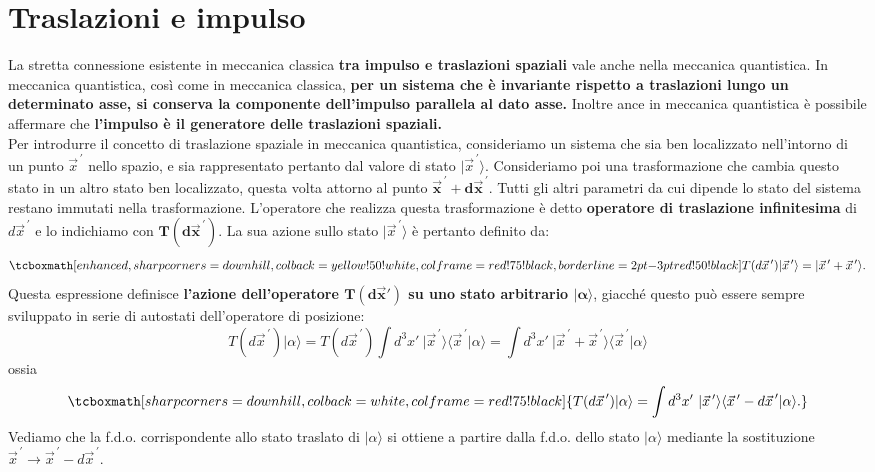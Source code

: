 \chapter[Traslazioni e impulso]{Traslazioni e impulso}
La stretta connessione esistente in meccanica classica \textbf{tra impulso e traslazioni spaziali} vale anche nella meccanica quantistica. In meccanica quantistica, così come in meccanica classica, \textbf{per un sistema che è invariante rispetto a traslazioni lungo un determinato asse, si conserva la componente dell'impulso parallela al dato asse.} Inoltre ance in meccanica quantistica è possibile affermare che \textbf{l'impulso è il generatore delle traslazioni spaziali.}\\

Per introdurre il concetto di traslazione spaziale in meccanica quantistica, consideriamo un sistema che sia ben localizzato nell'intorno di un punto ${\vec{x}}^{\, \prime}$ nello spazio, e sia rappresentato pertanto dal valore di stato $\vert {\vec{x}}^{\, \prime} \rangle$. Consideriamo poi una trasformazione che cambia questo stato in un altro stato ben localizzato, questa volta attorno al punto $\mathbf{{\vec{x}}^{\, \prime} + d{\vec{x}}^{\, \prime}}$. Tutti gli altri parametri da cui dipende lo stato del sistema restano immutati nella trasformazione. L'operatore che realizza questa trasformazione è detto \textbf{operatore di traslazione infinitesima} di $d{\vec{x}}^{\, \prime}$ e lo indichiamo con $\mathbf{T(d{\vec{x}}^{\, \prime})}$. La sua azione sullo stato
 $\vert {\vec{x}}^{\, \prime} \rangle$ è pertanto definito da:
	\begin{equation}
		\tcboxmath[enhanced,sharp corners=downhill ,colback=yellow!50!white,colframe=red!75!black, borderline={2pt}{-3pt}{red!50!black}]{	
			T(d{\vec{x}}^{\, \prime})\vert {\vec{x}}^{\, \prime} \rangle=\vert {\vec{x}}^{\, \prime}+ {\vec{x}}^{\, \prime} \rangle .
			}
	\end{equation}
Questa espressione definisce \textbf{l'azione dell'operatore $\mathbf{T(d\vec{x}')}$ su uno stato arbitrario $\mathbf{\vert \alpha \rangle}$}, giacché questo può essere sempre sviluppato in serie di autostati dell'operatore di posizione:
	\begin{equation}
		T({d\vec{x}}^{\, \prime}) \vert \alpha \rangle = T(d{\vec{x}}^{\, \prime}) \int d^3x' \ \vert {\vec{x}}^{\, \prime} \rangle \langle {\vec{x}}^{\, \prime} \vert \alpha \rangle =   \int d^3x' \ {\vert \vec{x}}^{\, \prime} + {\vec{x}}^{\, \prime} \rangle \langle {\vec{x}}^{\, \prime} \vert \alpha \rangle 
	\end{equation}
ossia
	\begin{equation}
		\tcboxmath[sharp corners=downhill ,colback=white,colframe=red!75!black]{
			T({d\vec{x}}^{\, \prime}) \vert \alpha \rangle  = \int d^3x' \ \vert {\vec{x}}^{\, \prime}  \rangle \langle {\vec{x}}^{\, \prime} - {d\vec{x}}^{\, \prime} \vert \alpha \rangle .
			}
	\end{equation}
Vediamo che la f.d.o. corrispondente allo stato traslato di $\vert \alpha \rangle $ si ottiene a partire dalla f.d.o. dello stato $\vert \alpha \rangle $ mediante la sostituzione ${\vec{x}}^{\, \prime} \rightarrow {\vec{x}}^{\, \prime}-d{\vec{x}}^{\, \prime}$.\\

